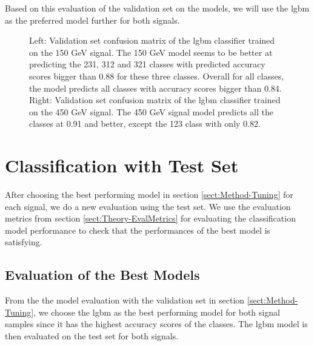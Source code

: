 \documentclass[a4paper, american, 12pt]{report}
\begin{document}
	Based on this evaluation of the validation set on the models, we will use the \acrshort{lgbm} as the preferred model further for both signals.
	\begin{figure}[h!]
		\hspace*{-1.2cm}
		\caption[Validation set confusion matrices for the \acrshort{lgbm} model trained.]{Left: Validation set confusion matrix of the \acrshort{lgbm} classifier trained on the 150 GeV signal. The 150 GeV model seems to be better at predicting the 231, 312 and 321 classes with predicted accuracy scores bigger than 0.88 for these three classes. Overall for all classes, the model predicts all classes with accuracy scores bigger than 0.84. Right: Validation set confusion matrix of the \acrshort{lgbm} classifier trained on the 450 GeV signal. The 450 GeV signal model predicts all the classes at 0.91 and better, except the 123 class with only 0.82. \label{fig:ConfVals}}
	\end{figure}
	
	
	\section{Classification with Test Set}
	\label{sect:Method-BestModelEval}
	After choosing the best performing model in section \ref{sect:Method-Tuning} for each signal, we do a new evaluation using the test set.  We use the evaluation metrics from section \ref{sect:Theory-EvalMetrics} for evaluating the classification model performance to check that the performances of the best model is satisfying. 
	

	\subsection{Evaluation of the Best Models}
	\label{subsect:Method-TestResult}
	From the the model evaluation with the validation set in section \ref{sect:Method-Tuning}, we choose the \acrshort{lgbm} as the best performing model for both signal samples since it has the highest accuracy scores of the classes. The \acrshort{lgbm} model is then evaluated on the test set for both signals.
	
\end{document}
